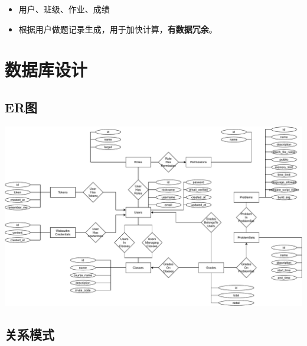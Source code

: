\documentclass{ctexrep}
\begin{document}
\begin{itemize}
\item
  用户、班级、作业、成绩
\item
  根据用户做题记录生成，用于加快计算，\textbf{有数据冗余}。
\end{itemize}

\section{数据库设计}


\subsection{ER图}

\includegraphics[width=\linewidth]{./course-design-er.pdf}


\subsection{关系模式}
\end{document}
